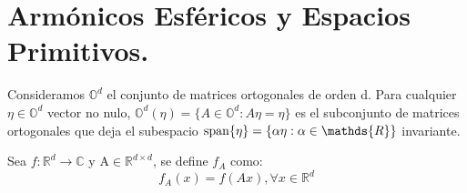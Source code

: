 %	
%	
%	

\section{Armónicos Esféricos y Espacios Primitivos.}
Consideramos $\mathds{O}^d$ el conjunto de matrices ortogonales de orden d. Para cualquier $\eta \in \mathds{O}^d$ vector no nulo, $\mathds{O}^d (\eta)= \{ A \in \mathds{O}^d : A\eta = \eta \} $ es el subconjunto de matrices ortogonales que deja el subespacio $\spn\{\eta\} = \{\alpha \eta : \alpha \in \mathds{R}\}$ invariante.

\begin{defn}
	Sea $f:\mathds{R}^d \to \mathds{C}$ y A$ \in \mathds{R}^{d \times d}$, se define $f_A$ como:
	$$
	f_A(x)=f(Ax)   , \forall x \in \mathds{R}^d
	$$
\end{defn}

